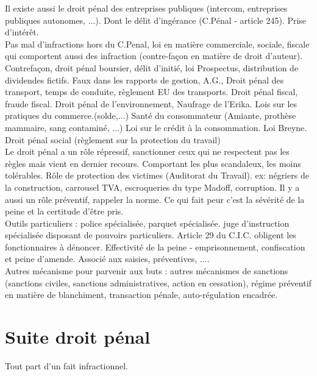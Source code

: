 \documentclass{book}
\begin{document}
Il existe aussi le droit pénal des entreprises publiques (intercom, entreprises publiques autonomes, ...). Dont le délit d'ingérance (C.Pénal - article 245). Prise d'intérêt.\\

Pas mal d'infractions hors du C.Penal, loi en matière commerciale, sociale, fiscale qui comportent aussi des infraction (contre-façon en matière de droit d'auteur). Contrefaçon, droit pénal boursier, délit d'initié, loi Prospectus, distribution de dividendes fictifs. Faux dans les rapports de gestion, A.G., Droit pénal des transport, temps de conduite, règlement EU des transports. Droit pénal fiscal, fraude fiscal. Droit pénal de l'environnement, Naufrage de l'Erika. Lois sur les pratiques du commerce.(solde,...) Santé du consommateur (Amiante, prothèse mammaire, sang contaminé, ...) Loi sur le crédit à la consommation. Loi Breyne. Droit pénal social (règlement sur la protection du travail)\\


Le droit pénal a un rôle répressif, sanctionner ceux qui ne respectent pas les règles mais vient en dernier recours. Comportant les plus scandaleux, les moins tolérables. Rôle de protection des victimes (Auditorat du Travail). ex: négriers de la construction, carrousel TVA, escroqueries du type Madoff, corruption. Il y a aussi un rôle préventif, rappeler la norme. Ce qui fait peur c'est la sévérité de la peine et la certitude d'être pris.\\

Outils particuliers : police spécialisée, parquet spécialisée. juge d'instruction spécialisée disposant de pouvoirs particuliers. Article 29 du C.I.C. obligent les fonctionnaires à dénoncer. Effectivité de la peine - emprisonnement, confiscation et peine d'amende. Associé aux saisies, préventives, ....\\

Autres mécanisme pour parvenir aux buts : autres mécanismes de sanctions (sanctions civiles, sanctions administratives, action en cessation), régime préventif en matière de blanchiment, transaction pénale, auto-régulation encadrée.\\

\section{Suite droit pénal}

Tout part d'un fait infractionnel. \\
\end{document}

